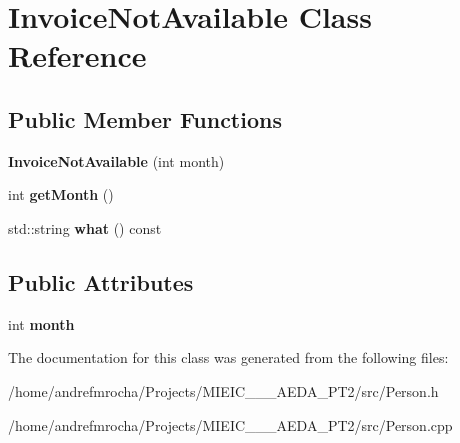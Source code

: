 \hypertarget{class_invoice_not_available}{}\section{Invoice\+Not\+Available Class Reference}
\label{class_invoice_not_available}
\subsection*{Public Member Functions}
\begin{DoxyCompactItemize}
\item 
\mbox{\label{class_invoice_not_available_ad8821a4be3e8d48aef9dcd971cc9e0d0}} 
{\bfseries Invoice\+Not\+Available} (int month)
\item 
\mbox{\label{class_invoice_not_available_aba76622dae4202950c43956f6ed0930e}} 
int {\bfseries get\+Month} ()
\item 
\mbox{\label{class_invoice_not_available_a77e49a07e8605a37f1a4c6c59742b898}} 
std\+::string {\bfseries what} () const
\end{DoxyCompactItemize}
\subsection*{Public Attributes}
\begin{DoxyCompactItemize}
\item 
\mbox{\label{class_invoice_not_available_a35029f0aa54b16c927f45adbac81f427}} 
int {\bfseries month}
\end{DoxyCompactItemize}


The documentation for this class was generated from the following files\+:\begin{DoxyCompactItemize}
\item 
/home/andrefmrocha/\+Projects/\+M\+I\+E\+I\+C\+\_\+\_\+\_\+\+A\+E\+D\+A\+\_\+\+P\+T2/src/Person.\+h\item 
/home/andrefmrocha/\+Projects/\+M\+I\+E\+I\+C\+\_\+\_\+\_\+\+A\+E\+D\+A\+\_\+\+P\+T2/src/Person.\+cpp\end{DoxyCompactItemize}
